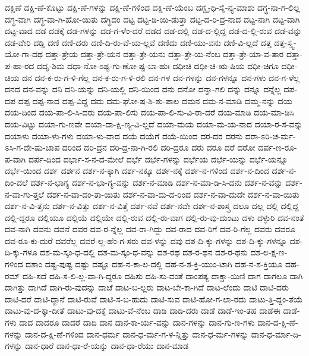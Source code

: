 {ದಕ್ಷಿಣೆ
ದಕ್ಷಿ-ಣೆ-ಕೊಟ್ಟು
ದಕ್ಷಿ-ಣೆ-ಗಳನ್ನು
ದಕ್ಷಿ-ಣೆ-ಗಳಿಂದ
ದಕ್ಷಿ-ಣೆ-ಯೆಂಬ
ದಗ್ದೃ-ಧಿ-ಸೈ-ನ್ಯ-ಮಾಶು
ದಗ್ಧ-ನಾ-ಗ-ಲಿಲ್ಲ
ದಗ್ಧ-ವಾಗಿ
ದಗ್ಧ-ವಾ-ಗಿ-ಹೋ-ಯಿತು
ದಗ್ಧಿದಂ
ದಟ್ಟ
ದಟ್ಟ-ಡಿ-ಯಿ-ಡುತ್ತಾ
ದಟ್ಟ-ದ-ರಿ-ದ್ರ-ನಾದ
ದಟ್ಟ-ನಾಗಿ
ದಟ್ಟ-ವಾಗಿ
ದಟ್ಟ-ವಾದ
ದಡ
ದಡಕ್ಕೆ
ದಡ-ಗಳನ್ನು
ದಡ-ಗ-ಳೆಂ-ದರೆ
ದಡದ
ದಡ-ದಲ್ಲಿ
ದಡ-ದ-ಲ್ಲಿದ್ದ
ದಡ-ದ-ಲ್ಲಿ-ರುವ
ದಡ-ವನ್ನು
ದಡ-ವೇರಿ
ದಡ್ಡಿ
ದಣಿ
ದಣಿ-ದರು
ದಣಿ-ದಿ-ರು-ವೆ-ಯ-ಲ್ಲವೆ
ದಣಿದು
ದಣಿ-ಯು-ವನು
ದಣಿ-ವಿ-ಲ್ಲದೆ
ದತ್ತ
ದತ್ತ-ಸ್ತ್ವ-ಯೋ-ಗಾ-ದಥ
ದತ್ತಾ-ತ್ರೇಯ
ದತ್ತಾ-ತ್ರೇ-ಯನ
ದತ್ತಾ-ತ್ರೇ-ಯನು
ದತ್ತಾ-ತ್ರೇ-ಯ-ನೆಂಬ
ದತ್ತಾ-ತ್ರೇ-ಯಾ-ವ-ತಾರ
ದತ್ತಾ-ಪ-ಹಾ-ರದ
ದದೃ-ಶಿಮ
ದಧಾ-ನೋ-ಽಷ್ಟ-ಗು-ಣೋ-ಷ್ಟ-ಬಾ-ಹುಃ
ದಧೀಚಿ
ದಧೀ-ಚಿ-ಋ-ಷಿಯ
ದಧೀ-ಚಿಗೂ
ದಧೀ-ಚಿಯ
ದನ
ದನ-ಕ-ರು-ಗ-ಳಿ-ಗೆಲ್ಲ
ದನ-ಕ-ರು-ಗ-ಳಿ-ರಲಿ
ದನ-ಗಳ
ದನ-ಗಳನ್ನು
ದನ-ಗಳನ್ನೂ
ದನ-ಗಳು
ದನ-ಗ-ಳೆಲ್ಲ
ದನದ
ದನ-ವನ್ನು
ದನಿ
ದನಿ-ಯನ್ನು
ದನಿ-ಯಲ್ಲಿ
ದನಿ-ಯಿಂದ
ದನು
ದನೋ
ದನ್ನಾ-ಗಲಿ
ದನ್ನು
ದನ್ನೂ
ದನ್ನೆಲ್ಲ
ದಪ-ದಪ
ದಪ್ಪ
ದಪ್ಪ-ನಾದ
ದಪ್ಪ-ವಿದ್ದ
ದಮ
ದಮ-ಘೋ-ಷ-ಶಿ-ಶು-ಪಾಲ
ದಮನ
ದಮ-ನ-ಮಾಡಿ
ದಮ್ಮ-ನನ್ನು
ದಯ
ದಯ-ದಿಂದ
ದಯ-ಪಾ-ಲಿ-ಸಿ-ದರು
ದಯ-ಪಾ-ಲಿಸು
ದಯ-ಪಾ-ಲಿ-ಸು-ವಿ-ರಾ-ದರೆ
ದಯ-ಮಾಡಿ
ದಯ-ಮಾ-ಡಿಸಿ
ದಯ-ವಿಟ್ಟು
ದಯಾ-ಗು-ಣವೇ
ದಯಾ-ದಾ-ಕ್ಷಿ-ಣ್ಯ-ವಿ-ಲ್ಲದೆ
ದಯಾ-ಮಯ
ದಯಾ-ಮ-ಯ-ನಾದ
ದಯಾ-ರ-ಸ-ವನ್ನು
ದಯಾಳು
ದಯಾ-ಳು-ಗಳು
ದಯಾ-ಳು-ವಾದ
ದಯೆ
ದಯೆಗೆ
ದಯೆ-ಯಿಂದ
ದರ-ದರ
ದರನು
ದರಾ-ಽರಿ-ಚ-ರ್ಮ-ಽಸಿ-ಗ-ದೇ-ಷು-ಚಾಪ
ದರಿಂದ
ದರಿ-ದ್ರನ
ದರಿ-ದ್ರ-ನಾ-ಗಿ-ರಲಿ
ದರಿ-ದ್ರರೂ
ದರು
ದರೂ
ದರೆ
ದರೋ
ದರ್ಪ-ಣ-ರೂ-ಪ-ವಾಗಿ
ದರ್ಪ-ದಿಂದ
ದರ್ಭಾ-ಸ-ನ-ದ-ಮೇಲೆ
ದರ್ಭೆ
ದರ್ಭೆ-ಗಳನ್ನು
ದರ್ಭೆಯ
ದರ್ಭೆ-ಯನ್ನು
ದರ್ಭೆ-ಯನ್ನೂ
ದರ್ಭೆ-ಯಿಂದ
ದರ್ಶ
ದರ್ಶನ
ದರ್ಶ-ನ-ಕ್ಕಾಗಿ
ದರ್ಶ-ನಕ್ಕೂ
ದರ್ಶ-ನಕ್ಕೆ
ದರ್ಶ-ನ-ಗಳಿಂದ
ದರ್ಶ-ನ-ದಿಂದ
ದರ್ಶ-ನ-ದಿಂ-ದಲೆ
ದರ್ಶ-ನ-ಭಾಗ್ಯ
ದರ್ಶ-ನ-ಭಾ-ಗ್ಯ-ವನ್ನು
ದರ್ಶ-ನ-ಮಾಡಿ
ದರ್ಶ-ನ-ಮಾ-ಡಿ-ಸಿ-ದನು
ದರ್ಶ-ನ-ವನ್ನು
ದರ್ಶ-ನ-ವಾ-ಗು-ತ್ತಲೆ
ದರ್ಶ-ನ-ವಾ-ದಂ-ತಾ-ಯಿತು
ದರ್ಶ-ನ-ವಾ-ದು-ದ-ರಿಂದ
ದರ್ಶ-ನ-ವಾ-ದುದೇ
ದರ್ಶ-ನ-ವಾ-ಯಿತು
ದರ್ಶ-ನ-ವಿ-ತ್ತನು
ದರ್ಶ-ನ-ವಿತ್ತು
ದರ್ಶ-ನ-ವಿತ್ತೆ
ದರ್ಶ-ನವೆ
ದರ್ಶ-ನವೇ
ದರ್ಶ-ನ-ಶಾಸ್ತ್ರ
ದಲೂ
ದಲ್ಲ
ದಲ್ಲಿ
ದಲ್ಲಿದ್ದ
ದಲ್ಲಿ-ದ್ದರೂ
ದಲ್ಲಿಯೂ
ದಲ್ಲಿಯೆ
ದಲ್ಲಿಯೇ
ದಲ್ಲಿ-ರುವ
ದಲ್ಲಿ-ರು-ವಾಗ
ದಲ್ಲಿ-ರು-ವು-ದುಂಟು
ದಳು
ದಳ್ಳುರಿ
ದವ-ನಂತೆ
ದವ-ನಾಗಿ
ದವನು
ದವನೆ
ದವರ
ದವ-ರ-ನ್ನೆಲ್ಲ
ದವ-ರಾ-ಗಿದ್ದು
ದವ-ರಾದ
ದವ-ರಿಗೆ
ದವ-ರಿ-ಗೆಲ್ಲ
ದವರು
ದವರೂ
ದವ-ರೂ-ಕು-ದುರೆ
ದವರೆಲ್ಲ
ದವರೆ-ಲ್ಲ-ಹೆಂ-ಗ-ಸರು
ದವ-ಳನ್ನು
ದವು
ದಶ-ದಿ-ಕ್ಕು-ಗಳನ್ನು
ದಶ-ದಿ-ಕ್ಕು-ಗಳನ್ನೂ
ದಶ-ದಿ-ಕ್ಕು-ಗಳೂ
ದಶ-ಮ-ಸ್ಕಂ-ಧ-ದಲ್ಲಿ
ದಶ-ಮ-ಸ್ಕಂ-ಧ-ವನ್ನು
ದಶ-ರಥ
ದಶ-ರ-ಥನ
ದಶ-ರ-ಥನು
ದಶ-ಲ-ಕ್ಷ-ಣ-ಗಳಿಂದ
ದಶಾಂ
ದಷ್ಟ-ಪುಷ್ಟ
ದಷ್ಟು
ದಷ್ಟೂ
ದಹ-ನ-ಕಾ-ಲ-ದಲ್ಲಿ
ದಹ-ನ-ಶ-ಕ್ತಿ-ಯುಂ-ಟಾಗಿ
ದಹ-ನ-ಶ-ಕ್ತಿಯೂ
ದಹ-ರಮ್
ದಹಿ-ಸದೆ
ದಹಿ-ಸ-ಲಿ-ಲ್ಲ-ವಾ-ಗಿ-ದ್ದರೂ
ದಹಿಸು
ದಹಿ-ಸು-ವಂತೆ
ದಾಂಪತ್ಯ
ದಾಕ್ಷಾ-ಯಿಣಿ
ದಾಗ
ದಾಗಲೂ
ದಾಗಿ
ದಾಗಿತ್ತು
ದಾಗಿದೆ
ದಾಗಿ-ರು-ವುದನ್ನು
ದಾಚೆ
ದಾಟ-ಬ-ಲ್ಲರು
ದಾಟ-ಬೇ-ಕಾ-ಗಿದೆ
ದಾಟ-ಲೆಂದು
ದಾಟಿ
ದಾಟಿ-ದರು
ದಾಟಿ-ದರೆ
ದಾಟಿ-ದ್ದಾನೆ
ದಾಟಿ-ರುವೆ
ದಾಟಿ-ಸ-ಬ-ಹುದು
ದಾಟಿ-ಸುವ
ದಾಟಿ-ಹೋ-ಗ-ಲಾ-ರದು
ದಾಟು-ತ್ತಿ-ದ್ದಂ-ತೆಯೆ
ದಾಟು-ವು-ದ-ಕ್ಕಾ-ದೀತೆ
ದಾಟು-ವು-ದಕ್ಕೆ
ದಾಟು-ವೆ-ನೆಂಬ
ದಾಡಿ
ದಾಡಿ-ದರು
ದಾಡೆ
ದಾಡೆ-ಇಂ-ತಹ
ದಾಡೆಈ
ದಾಡೆ-ಗಳು
ದಾದ
ದಾದರೂ
ದಾದರೆ
ದಾದಿ
ದಾನ
ದಾನ-ಕಾ-ರ್ಯ-ವನ್ನು
ದಾನ-ಗಳನ್ನು
ದಾನ-ಗು-ಣ-ಗಳು
ದಾನ-ದ-ಕ್ಷಿ-ಣೆ-ಗಳನ್ನು
ದಾನ-ದ-ಕ್ಷಿ-ಣೆ-ಗಳಿಂದ
ದಾನ-ಧರ್ಮ
ದಾನ-ಧ-ರ್ಮ-ಗ-ಳ-ನ್ನಿತ್ತು
ದಾನ-ಧ-ರ್ಮ-ಗಳನ್ನು
ದಾನ-ಧ-ರ್ಮಾ-ದಿ-ಗಳನ್ನು
ದಾನ-ಧಾರೆ
ದಾನ-ಧಾ-ರೆ-ಯನ್ನು
ದಾನ-ಧಾ-ರೆಯು
ದಾನ-ಮಾಡ
}
